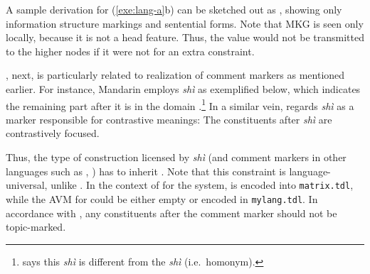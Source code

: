 

\noindent A sample derivation for (\ref{exe:lang-a}b) can be sketched
out as , showing only information
structure markings and sentential forms. Note that MKG is seen only
locally, because it is not a head feature. Thus, the value would not
be transmitted to the higher nodes if it were not for an extra
constraint.




, next, is particularly related to realization of
comment markers as mentioned earlier. For instance, Mandarin
 employs \textit{sh\`{i}} as exemplified below, which
indicates the remaining part after it is in the  domain
\citep{prince:12}.\footnote{\citet{prince:12} says this
  \textit{sh\`{i}} is different from the  \textit{sh\`{i}}
  (i.e.\ homonym).} In a similar vein, \citet{li:09} regards
\textit{sh\`{i}} as a marker responsible for contrastive meanings: The
constituents after \textit{sh\`{i}} are contrastively focused.




\noindent Thus, the type of construction licensed by \textit{sh\`{i}}
(and comment markers in other languages such as ,
\citealt{schneider:09}) has to inherit .  Note
that this constraint is language-universal, unlike
. In the context of  for the \lingo {} system,
 is encoded into \texttt{matrix.tdl}, while the
AVM for  could be either empty or encoded in
\texttt{mylang.tdl}.  In accordance with , any
constituents after the comment marker should not be topic-marked.

